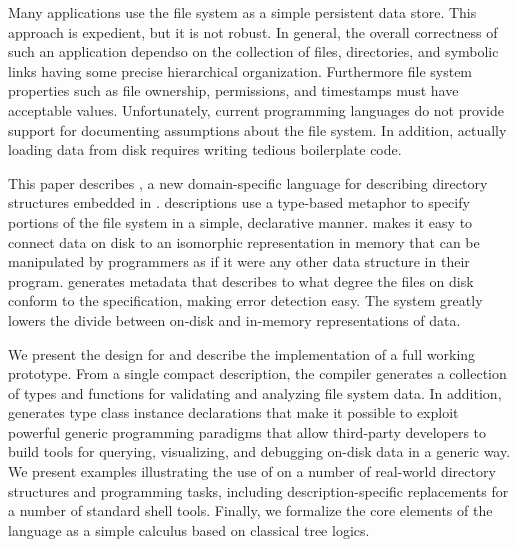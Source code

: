 Many applications use the file system as a simple persistent data
store.  This approach is expedient, but it is not robust.  In general,
the overall correctness of such an application dependso on the
collection of files, directories, and symbolic links having some
precise hierarchical organization. Furthermore file system properties
such as file ownership, permissions, and timestamps must have
acceptable values. Unfortunately, current programming languages do not
provide support for documenting assumptions about the file system. In
addition, actually loading data from disk requires writing tedious
boilerplate code.

This paper describes \forest{}, a new domain-specific language for
describing directory structures embedded in \haskell{}. \forest{}
descriptions use a type-based metaphor to specify portions of the file
system in a simple, declarative manner.  \forest{} makes it easy to
connect data on disk to an isomorphic representation in memory
that can be manipulated by programmers as if it were any other
data structure in their program.  \forest{} generates
metadata that describes to what degree the files on disk conform to
the specification, making error detection easy. The system greatly
lowers the divide between on-disk and in-memory representations of data.

We present the design for \forest{} and describe the implementation of
a full working prototype. From a single compact description, the
\forest{} compiler generates a collection of \haskell{} types and
functions for validating and analyzing file system data.  In addition,
\forest{} generates type class instance declarations that make it
possible to exploit powerful generic programming paradigms that allow
third-party developers to build tools for querying, visualizing, and
debugging on-disk data in a generic way. We present examples
illustrating the use of \forest{} on a number of real-world directory
structures and programming tasks, including description-specific
replacements for a number of standard shell tools. Finally, we
formalize the core elements of the language as a simple calculus based
on classical tree logics.